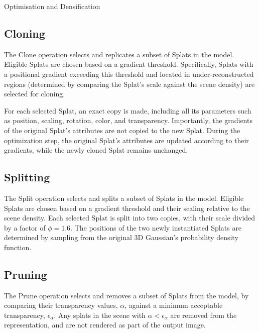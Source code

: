 \documentclass[11pt]{report}
\begin{document}
\begin{center} %
    \begin{minipage}{0.75\textwidth}
            \begin{algorithm}[H]
                
                \caption{Optimisation and Densification}
                \label{alg:original_algorithm} 
            \end{algorithm}
    \end{minipage}
\end{center}

\subsection{Cloning}
The Clone operation selects and replicates a subset of Splats in the model. Eligible Splats are chosen based on a gradient threshold. Specifically, Splats with a positional gradient exceeding this threshold and located in under-reconstructed regions (determined by comparing the Splat's scale against the scene density) are selected for cloning.

For each selected Splat, an exact copy is made, including all its parameters such as position, scaling, rotation, color, and transparency. Importantly, the gradients of the original Splat's attributes are not copied to the new Splat. During the optimization step, the original Splat's attributes are updated according to their gradients, while the newly cloned Splat remains unchanged.

\subsection{Splitting}
The Split operation selects and splits a subset of Splats in the model. Eligible Splats are chosen based on a gradient threshold and their scaling relative to the scene density. Each selected Splat is split into two copies, with their scale divided by a factor of $\phi = 1.6$. The positions of the two newly instantiated Splats are determined by sampling from the original 3D Gaussian's probability density function.

\subsection{Pruning}
The Prune operation selects and removes a subset of Splats from the model, by comparing their transparency values, $\alpha$, against a minimum acceptable transparency, $\epsilon_{\alpha}$. Any splats in the scene with $\alpha < \epsilon_{\alpha}$ are removed from the representation, and are not rendered as part of the output image.
\end{document}
